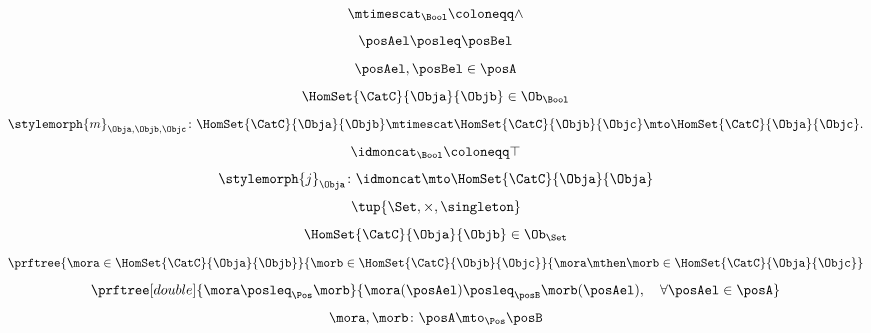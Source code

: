 {\begin{forslides}
\begin{equation*}
  \end{equation*}
    \begin{equation*}
    \label{eq:poset_bool_d}
    \mtimescat_\Bool \coloneqq \wedge
  \end{equation*}
      \begin{equation*}
    \label{eq:poset_bool_e}
    \posAel\posleq \posBel
  \end{equation*}
        \begin{equation*}
    \label{eq:poset_bool_f}
    \posAel,\posBel \in \posA
  \end{equation*}
\begin{equation*}
    \label{eq:poset_bool_g}
    \HomSet{\CatC}{\Obja}{\Objb}\in \Ob_\Bool
\end{equation*}
\begin{equation*}
  \label{eq:poset_bool_h}
      \stylemorph{m}_{\Obja,\Objb,\Objc}\colon \HomSet{\CatC}{\Obja}{\Objb}\mtimescat \HomSet{\CatC}{\Objb}{\Objc}\mto \HomSet{\CatC}{\Obja}{\Objc}.
\end{equation*}
  \begin{equation*}
    \label{eq:poset_bool_i}
    \idmoncat_\Bool \coloneqq \top
\end{equation*}
    \begin{equation*}
    \label{eq:poset_bool_k}
  \stylemorph{j}_\Obja\colon \idmoncat \mto \HomSet{\CatC}{\Obja}{\Obja}
\end{equation*}
    \begin{equation*}
    \label{eq:poset_bool_j}
  \tup{\Set, \times, \singleton}
\end{equation*}
  \begin{equation*}
    \label{eq:poset_bool_l}
    \HomSet{\CatC}{\Obja}{\Objb}\in \Ob_\Set
\end{equation*}
  \begin{equation*}
    \label{eq:poset_bool_m}
    \prftree{\mora \in \HomSet{\CatC}{\Obja}{\Objb}}{\morb \in \HomSet{\CatC}{\Objb}{\Objc}}{{\mora\mthen \morb \in \HomSet{\CatC}{\Obja}{\Objc}}}
\end{equation*}
  \begin{equation*}
    \label{eq:poset_pos_a}
    \prftree[double]{\mora \posleq_\Pos \morb}{\mora(\posAel)\posleq_\posB \morb(\posAel), \quad \forall \posAel \in \posA}
\end{equation*}
  \begin{equation*}
    \label{eq:poset_pos_b}
    \mora,\morb\colon \posA\mto_\Pos \posB
\end{equation*}
  \begin{definition}

\end{definition}
\end{forslides}}
